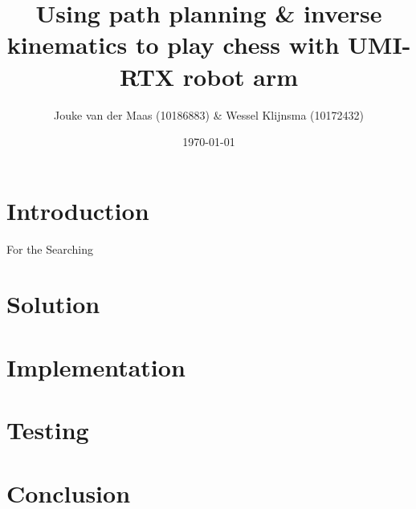 \documentclass[a4paper, 11pt]{article}
\title{Using path planning \& inverse kinematics to play chess with UMI-RTX robot arm}
\author{Jouke van der Maas (10186883)  \& Wessel Klijnsma (10172432)}
\date{\today}
\begin{document}
\maketitle

\section{Introduction}
For the Searching 

\section{Solution}

\section{Implementation}

\section{Testing}

\section{Conclusion}
    
\end{document}
